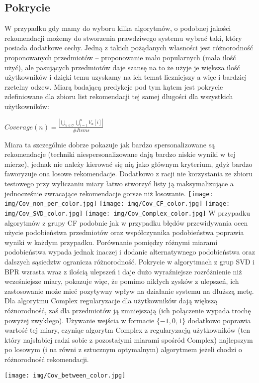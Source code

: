 \documentclass{pracamgr}
\begin{document}
   \subsection{Pokrycie}
    W przypadku gdy mamy do wyboru kilka algorytmów, o podobnej jakości rekomendacji możemy do stworzenia prawdziwego systemu wybrać taki,
    który posiada dodatkowe cechy. Jedną z takich pożądanych własności jest różnorodność proponowanych przedmiotów -- proponowanie mało popularnych
    (mała ilość użyć), ale pasujących przedmiotów daje szansę na to że użyje je większa ilość użytkowników i dzięki temu uzyskamy na ich temat liczniejszy
    a więc i bardziej rzetelny odzew. Miarą badającą predykcje pod tym kątem jest pokrycie zdefiniowane dla zbioru list rekomendacji tej samej
    długości dla wszystkich użytkowników:
    \begin{center}
     $Coverage(n)=\frac{|\bigcup\limits_{u\in U}\bigcup\limits_{i=1}^{n}V_u[i]|}{\#Items}$
    \end{center}
    Miara ta szczególnie dobrze pokazuje jak bardzo spersonalizowane są rekomendacje (techniki niespersonalizowane dają bardzo niskie wyniki w tej mierze),
    jednak nie należy kierować się nią jako głównym kryterium, gdyż bardzo faworyzuje ona losowe rekomendacje.
    Dodatkowo z racji nie korzystania ze zbioru testowego przy wyliczaniu miary łatwo stworzyć listy ją maksymalizujące
    a jednocześnie zwracające rekomendacje gorsze niż losowanie.\newline
    \texttt{[image: img/Cov\_non\_per\_color.jpg]}
    \texttt{[image: img/Cov\_CF\_color.jpg]}\newline
    \texttt{[image: img/Cov\_SVD\_color.jpg]}
    \texttt{[image: img/Cov\_Complex\_color.jpg]}\newline
    W przypadku algorytmów z grupy CF podobnie jak w przypadku błędów przewidywania ocen użycie podobieństwa przedmiotów oraz współczynnika podobieństwa
    poprawia wyniki w każdym przypadku. Porównanie pomiędzy różnymi miarami podobieństwa wypada jednak inaczej i dodanie alternatywnego podobieństwa oraz dalszych
    sąsiedztw ogranicza różnorodność.\newline
    Pokrycie w algorytmach z grup SVD i BPR wzrasta wraz z ilością ulepszeń i daje dużo wyraźniejsze rozróżnienie niż wcześniejsze miary, pokazuje więc, 
    że pomimo nikłych zysków z ulepszeń, ich zastosowanie może mieć pozytywny wpływ na działanie systemu na dłuższą metę.\newline
    Dla algorytmu Complex regularyzacje dla użytkowników dają większą różnorodność, zaś dla przedmiotów ją zmniejszają
    (ich połączenie wypada trochę powyżej zwykłego). Używanie wejścia w formacie $\{-1,0,1\}$ dodatkowo poprawia wartość tej miary,
    czyniąc algorytm Complex z regularyzacją użytkowników (ten który najsłabiej radzi sobie z pozostałymi miarami spośród Complex)
    najlepszym po losowym (i na równi z sztucznym optymalnym) algorytmem jeżeli chodzi o różnorodność rekomendacji.
    \begin{center}
    \texttt{[image: img/Cov\_between\_color.jpg]}
    \end{center}
\end{document}
